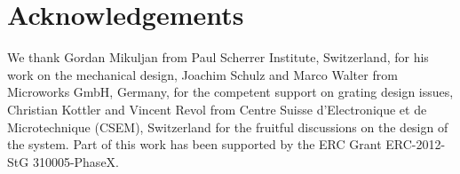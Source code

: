 \documentclass[aps,prl,preprint]{revtex4-1}
\begin{document}
\section*{Acknowledgements} We thank Gordan Mikuljan from Paul Scherrer
Institute, Switzerland, for his work on the mechanical design, Joachim
Schulz and Marco Walter from Microworks GmbH, Germany, for the competent
support on grating design issues, Christian Kottler and Vincent Revol from
Centre Suisse d'Electronique et de Microtechnique (CSEM), Switzerland for
the fruitful discussions on the design of the system.
Part of this work has been supported by the ERC Grant ERC-2012-StG 310005-PhaseX.

 
\end{document}
